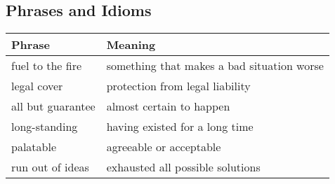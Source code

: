 \documentclass{article}%
\begin{document}
\subsection{Phrases and Idioms}%
\label{subsec:PhrasesandIdioms}%
\begin{tabular}{ll}%
Phrase&Meaning\\%
\hline%
fuel to the fire&something that makes a bad situation worse\\%
legal cover&protection from legal liability\\%
all but guarantee&almost certain to happen\\%
long{-}standing&having existed for a long time\\%
palatable&agreeable or acceptable\\%
run out of ideas&exhausted all possible solutions\\%
\end{tabular}

%
\end{document}
